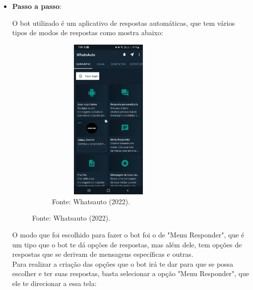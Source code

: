 \begin{itemize}

		\item \textbf{Passo a passo}: 

        O bot utilizado é um aplicativo de respostas automáticas, que tem vários tipos de modos de respostas como mostra abaixo: \newpage	

\begin{figure}[!htb]
\centering
\captionsetup[subfigure]{labelformat=empty}
\caption{``Opções''}
\begin{subfigure}{.5\textwidth}
\centering
\includegraphics[width=6cm,height=8cm]{Bot/Partes/Imagens/Opções.jpeg}
\caption{Fonte: Whatsauto (2022).}
\end{subfigure}%
\end{figure}

        O modo que foi escolhido para fazer o bot foi o de "Menu Responder", que é um tipo que o bot te dá opções de respostas, mas além dele, tem opções de respostas que se derivam de mensagens específicas e outras. \\

        Para realizar a criação das opções que o bot irá te dar para que se possa escolher e ter suas respostas, basta selecionar a opção "Menu Responder", que ele te direcionar a essa tela: \\ %


\end{itemize}
